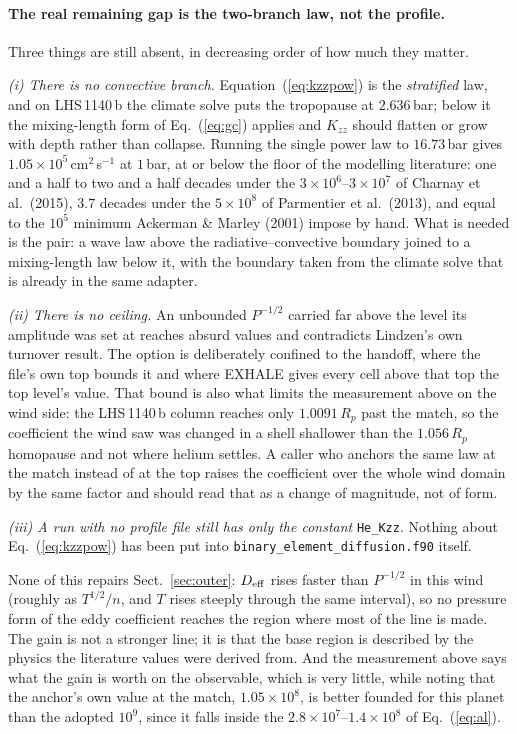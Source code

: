 \documentclass[english,a4paper]{my_memo}
\begin{document}
\paragraph{The real remaining gap is the two-branch law, not the profile.}
Three things are still absent, in decreasing order of how much they matter.

\emph{(i) There is no convective branch.} Equation~(\ref{eq:kzzpow}) is the
\emph{stratified} law, and on LHS\,1140\,b the climate solve puts the
tropopause at $2.636$\,bar; below it the mixing-length form of
Eq.~(\ref{eq:gc}) applies and $K_{zz}$ should flatten or grow with depth
rather than collapse. Running the single power law to $16.73$\,bar gives
$1.05\times10^{5}$\,cm$^2$\,s$^{-1}$ at $1$\,bar, at or below the floor of
the modelling literature: one and a half to two and a half decades under
the $3\times10^{6}$--$3\times10^{7}$ of Charnay et al.\ (2015), $3.7$
decades under the $5\times10^{8}$ of Parmentier et al.\ (2013), and equal to
the $10^{5}$ minimum Ackerman \& Marley (2001) impose by hand. What is
needed is the pair: a wave law above the radiative--convective boundary
joined to a mixing-length law below it, with the boundary taken from the
climate solve that is already in the same adapter.

\emph{(ii) There is no ceiling.} An unbounded $P^{-1/2}$ carried far above
the level its amplitude was set at reaches absurd values and contradicts
Lindzen's own turnover result. The option is deliberately confined to the
handoff, where the file's own top bounds it and where EXHALE gives every
cell above that top the top level's value. That bound is also what limits
the measurement above on the wind side: the LHS\,1140\,b column reaches only
$1.0091\,R_p$ past the match, so the coefficient the wind saw was changed in
a shell shallower than the $1.056\,R_p$ homopause and not where helium
settles. A caller who anchors the same law at the match instead of at the
top raises the coefficient over the whole wind domain by the same factor and
should read that as a change of magnitude, not of form.

\emph{(iii) A run with no profile file still has only the constant}
\texttt{He\_Kzz}. Nothing about Eq.~(\ref{eq:kzzpow}) has been put into
\texttt{binary\_element\_diffusion.f90} itself.

None of this repairs Sect.~\ref{sec:outer}: $D_{\rm eff}$ rises faster than
$P^{-1/2}$ in this wind (roughly as $T^{1/2}/n$, and $T$ rises steeply
through the same interval), so no pressure form of the eddy coefficient
reaches the region where most of the line is made. The gain is not a
stronger line; it is that the base region is described by the physics the
literature values were derived from. And the measurement above says what the
gain is worth on the observable, which is very little, while noting that
the anchor's own value at the match, $1.05\times10^{8}$, is better founded
for this planet than the adopted $10^{9}$, since it falls inside the
$2.8\times10^{7}$--$1.4\times10^{8}$ of Eq.~(\ref{eq:al}).
\end{document}
